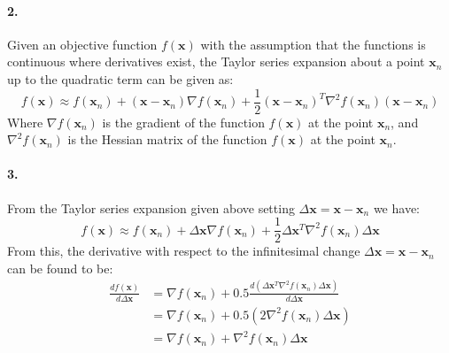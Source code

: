 \documentclass{article}
\begin{document}
\paragraph*{2.} Given an objective function $f(\mathbf{x})$ with the assumption that the functions is continuous where derivatives exist, the Taylor series expansion about a point $\mathbf{x}_{n}$ up to the quadratic term can be given as:
\begin{equation*}
    f(\mathbf{x}) \approx f(\mathbf{x}_{n}) + (\mathbf{x} - \mathbf{x}_{n})\nabla f(\mathbf{x}_{n}) + \frac{1}{2}(\mathbf{x} - \mathbf{x}_{n})^{T}\nabla^{2}f(\mathbf{x}_{n})(\mathbf{x} - \mathbf{x}_{n})
\end{equation*}
Where $\nabla f(\mathbf{x}_{n})$ is the gradient of the function $f(\mathbf{x})$ at the point $\mathbf{x}_{n}$, and $\nabla^{2} f(\mathbf{x}_{n})$ is the Hessian matrix of the function $f(\mathbf{x})$ at the point $\mathbf{x}_{n}$.



\paragraph*{3.}
From the Taylor series expansion given above setting $\Delta \mathbf{x} = \mathbf{x} - \mathbf{x}_{n}$ we have:
\begin{equation}
    f(\mathbf{x}) \approx f(\mathbf{x}_{n}) + \Delta \mathbf{x}\nabla f(\mathbf{x}_{n}) + \frac{1}{2}\Delta \mathbf{x}^{T}\nabla^{2}f(\mathbf{x}_{n})\Delta \mathbf{x}
\end{equation}
From this, the derivative with respect to the infinitesimal change $\Delta \mathbf{x} = \mathbf{x} - \mathbf{x}_{n}$ can be found to be:
\begin{align*}
    \frac{df(\mathbf{x})}{d\Delta \mathbf{x}} &= \nabla f(\mathbf{x}_{n}) + 0.5\frac{d(\Delta \mathbf{x}^{T}\nabla^{2}f(\mathbf{x}_{n})\Delta \mathbf{x})}{d\Delta \mathbf{x}}\\
    &= \nabla f(\mathbf{x}_{n}) + 0.5(2\nabla^{2}f(\mathbf{x}_{n})\Delta \mathbf{x})\\
    &= \nabla f(\mathbf{x}_{n}) + \nabla^{2}f(\mathbf{x}_{n})\Delta \mathbf{x}
\end{align*}
\end{document}
